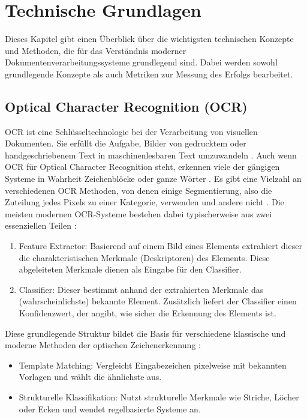 \chapter{Technische Grundlagen}
\label{cha:Technische Grundlagen}

Dieses Kapitel gibt einen Überblick über die wichtigsten technischen Konzepte und Methoden, die für das Verständnis moderner Dokumentenverarbeitungssysteme grundlegend sind. Dabei werden sowohl grundlegende Konzepte als auch Metriken zur Messung des Erfolgs bearbeitet. 

\section{Optical Character Recognition (OCR)}
\label{sec:optical-character-recognition-ocr}

\gls{OCR} ist eine Schlüsseltechnologie bei der Verarbeitung von visuellen Dokumenten. Sie erfüllt die Aufgabe, Bilder von gedrucktem oder handgeschriebenem Text in maschinenlesbaren Text umzuwandeln \cite{MoriS.1992HroO}.
Auch wenn \gls{OCR} für Optical Character Recognition steht, erkennen viele der gängigen Systeme in Wahrheit Zeichenblöcke oder ganze Wörter \cite{BorovikovEugene2014Asom}.
Es gibt eine Vielzahl an verschiedenen \gls{OCR} Methoden, von denen einige Segmentierung, also die Zuteilung jedes Pixels zu einer Kategorie, verwenden und andere nicht \cite{BorovikovEugene2014Asom}. Die meisten modernen \gls{OCR}-Systeme bestehen dabei typischerweise aus zwei essenziellen Teilen \cite{BorovikovEugene2014Asom}:

\begin{enumerate}
    \item Feature Extractor: Basierend auf einem Bild eines Elements extrahiert dieser die charakteristischen Merkmale (Deskriptoren) des Elements. Diese abgeleiteten Merkmale dienen als Eingabe für den Classifier.
    \item Classifier: Dieser bestimmt anhand der extrahierten Merkmale das (wahrscheinlichste) bekannte Element. Zusätzlich liefert der Classifier einen Konfidenzwert, der angibt, wie sicher die Erkennung des Elements ist.
\end{enumerate}

Diese grundlegende Struktur bildet die Basis für verschiedene klassische und moderne Methoden der optischen Zeichenerkennung \cite{BorovikovEugene2014Asom}:

\begin{itemize}
\item Template Matching: Vergleicht Eingabezeichen pixelweise mit bekannten Vorlagen und wählt die ähnlichste aus.
\item Strukturelle Klassifikation: Nutzt strukturelle Merkmale wie Striche, Löcher oder Ecken und wendet regelbasierte Systeme an.
\end{itemize}

